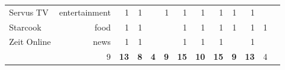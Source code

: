{\begin{landscape}
\begin{center}
\begin{table}[!htp]
\begin{tabular}{lrrrrrrrrrrrr}
                Servus TV &entertainment &1 &1 & &1 &1 &1 &1 &1 &1 & \\
                Starcook &food &1 &1 & & &1 &1 &1 &1 &1 &1 \\
                Zeit Online &news &1 &1 & & &1 &1 &1 & &1 & \\
                \midrule
                &9 &\cellcolor[HTML]{A8A8A8}\textbf{13} &\cellcolor[HTML]{A8A8A8}\textbf{8} &\textbf{4} &\cellcolor[HTML]{A8A8A8}\textbf{9} &\cellcolor[HTML]{A8A8A8}\textbf{15} &\cellcolor[HTML]{A8A8A8}\textbf{10} &\cellcolor[HTML]{A8A8A8}\textbf{15} &\cellcolor[HTML]{A8A8A8}\textbf{9} &\cellcolor[HTML]{A8A8A8}\textbf{13} &4 \\
                \bottomrule
                \end{tabular}
            \end{table}
            

\end{center}
\end{landscape}}
